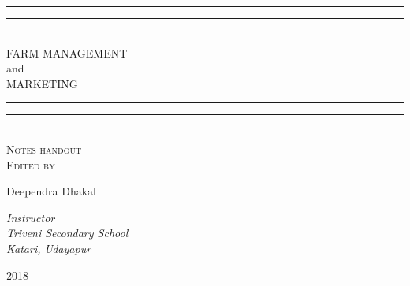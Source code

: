 \begin{titlepage}
	\textheight
	\centering
	\vspace*{\baselineskip}
	\rule{\textwidth}{1.6pt}\vspace*{-\baselineskip}\vspace*{2pt}
	\rule{\textwidth}{0.4pt}\\[\baselineskip]
	{\Large FARM MANAGEMENT\\[1.2\baselineskip] and \\[1.2\baselineskip] MARKETING}\\[1.2\baselineskip]
	\rule{\textwidth}{0.4pt}\vspace*{-\baselineskip}\vspace{3.2pt}
	\rule{\textwidth}{1.6pt}\\[\baselineskip]
	\scshape
	Notes handout \\ %
	\vspace*{3\baselineskip}
	Edited by \\[\baselineskip]
	{\Large Deependra Dhakal\par} %
	{\itshape Instructor \\ Triveni Secondary School \\ Katari, Udayapur\par} %
	\vfill
	{\scshape 2018} \\
\end{titlepage}